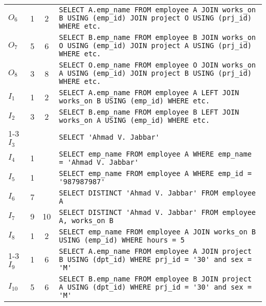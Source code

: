 \begin{tabular}{l|cc|l}
\cline{1-3}
$O_{6}$ & \textcolor{ACMOrange}{1} & \textcolor{ACMOrange}{2} & \lstinline[basicstyle=\scriptsize\ttfamily,keepspaces=true]|SELECT A.emp_name FROM employee A JOIN works_on B USING (emp_id) JOIN project O USING (prj_id) WHERE etc.| \\
$O_{7}$ & 5 & 6 & \lstinline[basicstyle=\scriptsize\ttfamily,keepspaces=true]|SELECT B.emp_name FROM employee B JOIN works_on O USING (emp_id) JOIN project A USING (prj_id) WHERE etc.| \\
$O_{8}$ & \textcolor{ACMOrange}{3} & 8 & \lstinline[basicstyle=\scriptsize\ttfamily,keepspaces=true]|SELECT O.emp_name FROM employee O JOIN works_on A USING (emp_id) JOIN project B USING (prj_id) WHERE etc.| \\
\hline
$I_{1}$ & \textcolor{ACMRed}{1} & \textcolor{ACMRed}{2} & \lstinline[basicstyle=\scriptsize\ttfamily,keepspaces=true]|SELECT A.emp_name FROM employee A LEFT JOIN works_on B USING (emp_id) WHERE etc.| \\
$I_{2}$ & \textcolor{ACMRed}{3} & \textcolor{ACMRed}{2} & \lstinline[basicstyle=\scriptsize\ttfamily,keepspaces=true]|SELECT B.emp_name FROM employee B LEFT JOIN works_on A USING (emp_id) WHERE etc.| \\
\cline{1-3}
$I_{3}$ &  &  & \lstinline[basicstyle=\scriptsize\ttfamily,keepspaces=true]|SELECT 'Ahmad V. Jabbar' | \\
\cline{1-3}
$I_{4}$ & \textcolor{ACMRed}{1} &  & \lstinline[basicstyle=\scriptsize\ttfamily,keepspaces=true]|SELECT emp_name FROM employee A WHERE emp_name = 'Ahmad V. Jabbar'| \\
$I_{5}$ & \textcolor{ACMRed}{1} &  & \lstinline[basicstyle=\scriptsize\ttfamily,keepspaces=true]|SELECT emp_name FROM employee A WHERE emp_id = '987987987'| \\
\cline{1-3}
$I_{6}$ & 7 &  & \lstinline[basicstyle=\scriptsize\ttfamily,keepspaces=true]|SELECT DISTINCT 'Ahmad V. Jabbar' FROM employee A| \\
$I_{7}$ & 9 & 10 & \lstinline[basicstyle=\scriptsize\ttfamily,keepspaces=true]|SELECT DISTINCT 'Ahmad V. Jabbar' FROM employee A, works_on B| \\
\cline{1-3}
$I_{8}$ & \textcolor{ACMRed}{1} & \textcolor{ACMRed}{2} & \lstinline[basicstyle=\scriptsize\ttfamily,keepspaces=true]|SELECT emp_name FROM employee A JOIN works_on B USING (emp_id) WHERE hours = 5| \\
\cline{1-3}
$I_{9}$ & \textcolor{ACMRed}{1} & 6 & \lstinline[basicstyle=\scriptsize\ttfamily,keepspaces=true]|SELECT A.emp_name FROM employee A JOIN project B USING (dpt_id) WHERE prj_id = '30' and sex = 'M'| \\
$I_{10}$ & 5 & 6 & \lstinline[basicstyle=\scriptsize\ttfamily,keepspaces=true]|SELECT B.emp_name FROM employee B JOIN project A USING (dpt_id) WHERE prj_id = '30' and sex = 'M'| \\
    \end{tabular}
    